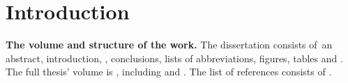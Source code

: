 \chapter*{Introduction}                         %

\newcommand{\actuality}{}
\newcommand{\progress}{}
\newcommand{\aim}{{\textbf\aimTXT}}
\newcommand{\tasks}{\textbf{\tasksTXT}}
\newcommand{\novelty}{\textbf{\noveltyTXT}}
\newcommand{\influence}{\textbf{\influenceTXT}}
\newcommand{\methods}{\textbf{\methodsTXT}}
\newcommand{\defpositions}{\textbf{\defpositionsTXT}}
\newcommand{\reliability}{\textbf{\reliabilityTXT}}
\newcommand{\probation}{\textbf{\probationTXT}}
\newcommand{\contribution}{\textbf{\contributionTXT}}
\newcommand{\publications}{\textbf{\publicationsTXT}}





\textbf{The volume and structure of the work.} 
The dissertation consists of~an abstract, introduction,
,
conclusions, lists of abbreviations, figures, tables and .
The full thesis' volume is
, including
 and
.
The list of references consists of .
